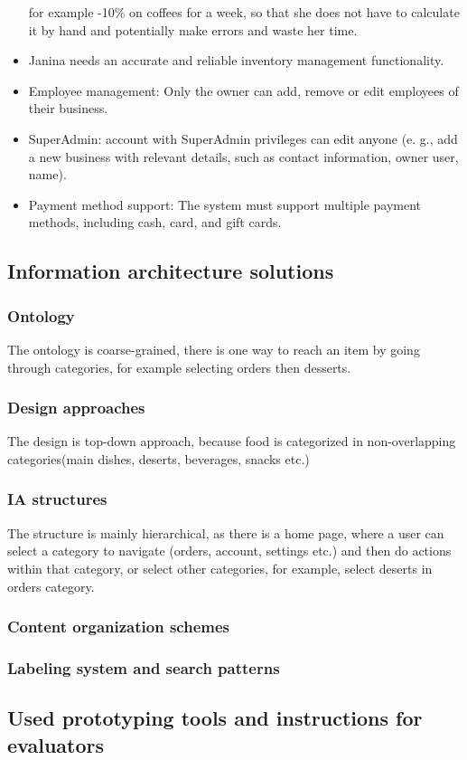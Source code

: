\documentclass{article}
\begin{document}
\begin{itemize}
for example -10\% on coffees for a week, so that she does not have to
calculate it by hand and potentially make errors and waste her time.
\item  Janina needs an accurate and reliable inventory management functionality.
\item Employee management: Only the owner can add, remove or edit employees
of their business.
\item SuperAdmin: account with SuperAdmin privileges can edit anyone (e. g.,
add a new business with relevant details, such as contact information,
owner user, name).
\item Payment method support: The system must support multiple payment
methods, including cash, card, and gift cards.
\end{itemize}

\subsection{Information architecture solutions}

\subsubsection{Ontology}
The ontology is coarse-grained, there is one way to reach an item by going through categories, for example selecting orders then desserts.
\subsubsection{Design approaches}
The design is top-down approach, because food is categorized in non-overlapping categories(main dishes, deserts, beverages, snacks etc.)
\subsubsection{IA structures}
The structure is mainly hierarchical, as there is a home page, where a user can select a category to navigate (orders, account, settings etc.) and then do actions within that category, or select other categories, for example, select deserts in orders category.
\subsubsection{Content organization schemes}

\subsubsection{Labeling system and search patterns}

\subsection{Used prototyping tools and instructions for evaluators}
\end{document}
